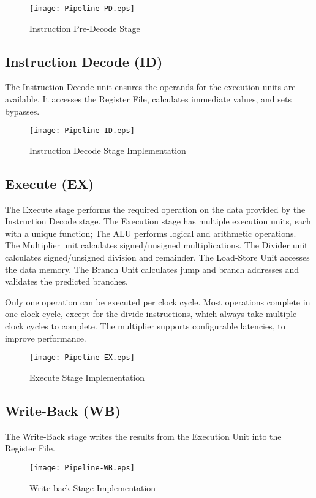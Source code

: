 \begin{figure}[th]
  \texttt{[image: Pipeline-PD.eps]}
  \caption{Instruction Pre-Decode Stage}
\end{figure}

\pagebreak

\subsection{Instruction Decode (ID)}\label{instruction-decode-id-1}

The Instruction Decode unit ensures the operands for the execution units
are available. It accesses the Register File, calculates immediate
values, and sets bypasses.

\begin{figure}[h]
  \texttt{[image: Pipeline-ID.eps]}
  \caption{Instruction Decode Stage Implementation}
\end{figure}

\pagebreak

\subsection{Execute (EX)}\label{execute-ex-1}

The Execute stage performs the required operation on the data provided by the Instruction Decode stage. The Execution stage has multiple execution units, each with a unique function;
The ALU performs logical and arithmetic operations.
The Multiplier unit calculates signed/unsigned multiplications.
The Divider unit calculates signed/unsigned division and remainder.
The Load-Store Unit accesses the data memory.
The Branch Unit calculates jump and branch addresses and validates the predicted branches.

Only one operation can be executed per clock cycle.
Most operations complete in one clock cycle, except for the divide instructions, which always take multiple clock cycles to complete. The multiplier supports configurable latencies, to improve performance.


\begin{figure}[h]
  \texttt{[image: Pipeline-EX.eps]}
  \caption{Execute Stage Implementation}
\end{figure}

\pagebreak

\subsection{Write-Back (WB)}\label{write-back-wb-1}

The Write-Back stage writes the results from the Execution Unit into the Register File.

\begin{figure}[h]
  \texttt{[image: Pipeline-WB.eps]}
  \caption{Write-back Stage Implementation}
\end{figure}
